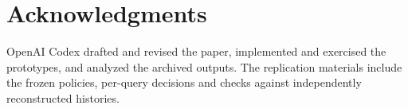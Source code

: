 \documentclass[conference]{IEEEtran}
\begin{document}
\section*{Acknowledgments}
OpenAI Codex drafted and revised the paper, implemented and exercised the prototypes, and analyzed the archived outputs. The replication materials include the frozen policies, per-query decisions and checks against independently reconstructed histories.



\end{document}

